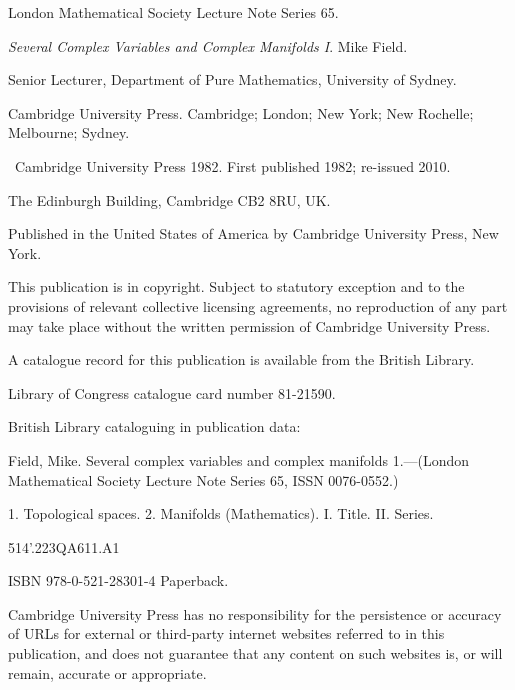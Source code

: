 \clearpage
\begingroup
    \thispagestyle{empty}
    \markboth{}{}
\noindent London Mathematical Society Lecture Note Series 65.\par
\emph{Several Complex Variables and Complex Manifolds I}. Mike Field.\par
Senior Lecturer, Department of Pure Mathematics, University of Sydney.\par
Cambridge University Press. Cambridge; London; New York; New Rochelle; Melbourne; Sydney.

\noindent\textcopyright\ Cambridge University Press 1982. First published 1982; re-issued 2010.\par
The Edinburgh Building, Cambridge CB2 8RU, UK.\par
Published in the United States of America by Cambridge University Press, New York.

\noindent This publication is in copyright. Subject to statutory exception and to the provisions of relevant collective licensing agreements, no reproduction of any part may take place without the written permission of Cambridge University Press.

\noindent A catalogue record for this publication is available from the British Library.\par
Library of Congress catalogue card number 81-21590.

\noindent British Library cataloguing in publication data:\par
Field, Mike. Several complex variables and complex manifolds 1.---(London Mathematical Society Lecture Note Series 65, ISSN 0076-0552.)\par
1. Topological spaces. 2. Manifolds (Mathematics). I. Title. II. Series.\par
514'.223\qquad QA611.A1\par
ISBN 978-0-521-28301-4 Paperback.

\noindent Cambridge University Press has no responsibility for the persistence or accuracy of URLs for external or third-party internet websites referred to in this publication, and does not guarantee that any content on such websites is, or will remain, accurate or appropriate.
    \clearpage
\endgroup
